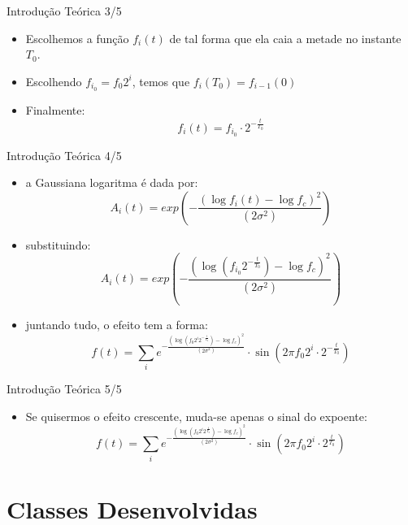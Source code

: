 \documentclass{beamer}
\begin{document}
\begin{frame}{Introdução Teórica 3/5}
\begin{itemize}
\item Escolhemos a função $f_i(t)$ de tal forma que ela caia a metade no instante $T_0$.
\item Escolhendo $f_{i_0} = f_0 2^i$, temos que $f_i(T_0) = f_{i-1}(0)$
\item Finalmente:
	\begin{equation}
		f_i(t) = f_{i_0}\cdot 2^{-\frac{t}{T_0}}
	\end{equation}
\end{itemize}
\end{frame}

\begin{frame}{Introdução Teórica 4/5}
\begin{itemize}
\item a Gaussiana logaritma é dada por:
	\begin{equation}
		A_i(t) = exp(-\frac{(\log f_i(t) - \log f_c)^2}{(2\sigma^2)})
	\end{equation}
\item substituindo:
	\begin{equation}
		A_i(t) = exp(-\frac{(\log (f_{i_0} 2^{-\frac{t}{T_0}}) - \log f_c)^2}{(2\sigma^2)})
	\end{equation}

\item juntando tudo, o efeito tem a forma:
\begin{equation}
	f(t) = \sum_{i} e^{-\frac{(\log (f_0 2^i 2^{-\frac{t}{T_0}}) - \log f_c)^2}{(2\sigma^2)}} \cdot \sin(2 \pi f_0 2^i\cdot 2^{-\frac{t}{T_0}})
\end{equation}
\end{itemize}
\end{frame}

\begin{frame}{Introdução Teórica 5/5}
\begin{itemize}
\item Se quisermos o efeito crescente, muda-se apenas o sinal do expoente:
\begin{equation}
	f(t) = \sum_{i} e^{-\frac{(\log (f_0 2^i 2^{\frac{t}{T_0}}) - \log f_c)^2}{(2\sigma^2)}} \cdot \sin(2 \pi f_0 2^i\cdot 2^{\frac{t}{T_0}})
\end{equation}
\end{itemize}
\end{frame}

\section{Classes Desenvolvidas}
\end{document}
